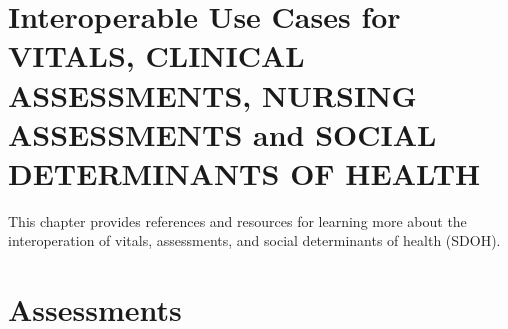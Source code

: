 \documentclass[
]{journal}
\begin{document}
\hypertarget{interoperable-use-cases-for-vitals-clinical-assessments-nursing-assessments-and-social-determinants-of-health}{%
\section{Interoperable Use Cases for VITALS, CLINICAL ASSESSMENTS, NURSING ASSESSMENTS and SOCIAL DETERMINANTS OF HEALTH}\label{interoperable-use-cases-for-vitals-clinical-assessments-nursing-assessments-and-social-determinants-of-health}}

This chapter provides references and resources for learning more about the interoperation of vitals, assessments, and social determinants of health (SDOH).

\hypertarget{assessments}{%
\section{Assessments}\label{assessments}}
\end{document}
